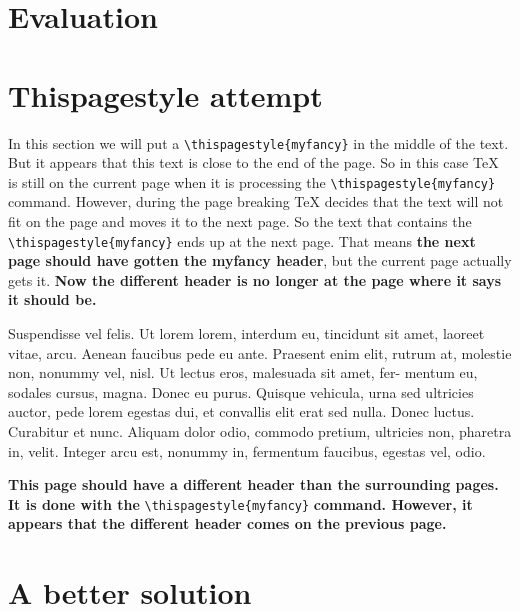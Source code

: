 \documentclass[openany]{book}
\begin{document}
\lipsum[2-3]

\section{Evaluation}

\lipsum[3-5]

\newpage

\section{Thispagestyle attempt}

In this section we will put a \verb|\thispagestyle{myfancy}| in the middle of the text. But it appears that this text is close to the end of the page. So in this case \TeX{} is still on the current page when it is processing the \verb|\thispagestyle{myfancy}| command. However, during the page breaking \TeX{} decides that the text will not fit on the page and moves it to the next page. So the text that contains the \verb|\thispagestyle{myfancy}| ends up at the next page. That means \textbf{the next page should have gotten the myfancy header}, but the current page actually gets it.  \textbf{Now the different header is no longer at the page where it says it should be.}

\bigskip

\lipsum[6-8]

\bigskip
Suspendisse vel felis. Ut lorem lorem, interdum eu, tincidunt sit amet, laoreet vitae, arcu. Aenean faucibus pede eu ante. Praesent enim elit, rutrum at, molestie non, nonummy vel, nisl. Ut lectus eros, malesuada sit amet, fer- mentum eu, sodales cursus, magna. Donec eu purus. Quisque vehicula, urna sed ultricies auctor, pede lorem egestas dui, et convallis elit erat sed nulla. Donec luctus. Curabitur et nunc. Aliquam dolor odio, commodo pretium, ultricies non, pharetra in, velit. Integer arcu est, nonummy in, fermentum faucibus, egestas vel, odio.

\bigskip

\textbf{This page should have a different header than the surrounding pages. 
\thispagestyle{myfancy}
It is done with the} \verb|\thispagestyle{myfancy}| \textbf{command.
However, it appears that the different header comes on the previous page.}

\bigskip

\lipsum[8-9]

\newpage

\section{A better solution}
\end{document}
